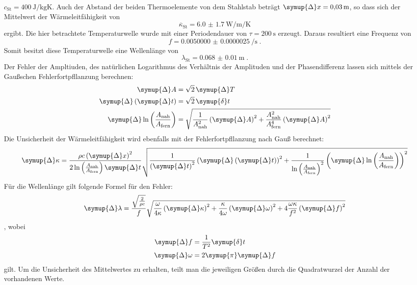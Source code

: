 $c_\text{St} = \SI{400}{\joule\per\kilogram\kelvin}$. Auch der Abstand der beiden Thermoelemente von dem Stahlstab
beträgt $\symup{\Delta} x = \SI{0.03}{\metre}$, so dass sich der Mittelwert der Wärmeleitfähigkeit von
\begin{equation}
  \overline{\kappa}_\text{St} = \SI{6.0(17)}{\watt\per\metre\per\kelvin}
\end{equation}
ergibt. Die hier betrachtete Temperaturwelle wurde mit einer Periodendauer von $\tau = \SI{200}{\second}$ erzeugt.
Daraus resultiert eine Frequenz von 
\begin{equation}
  f = \SI{0.0050000(25)}{\per\second} \; \text{.}
\end{equation}
Somit besitzt diese Temperaturwelle eine Wellenlänge von 
\begin{equation}
  \lambda_\text{St} = \SI{0.068(10)}{\metre} \; \text{.}
\end{equation}
Der Fehler der Ampltiuden, des natürlichen Logarithmus des Verhältnis der Amplituden und der Phasendifferenz 
lassen sich mittels der Gaußschen Fehlerfortpfllanzung berechnen:
\begin{align}
  \symup{\Delta} A                                                      &= \sqrt{2} \, \symup{\Delta} T \\
  \symup{\Delta} \left (\symup{\Delta} t \right )                       &= \sqrt{2} \, \symup{\delta} t \\
  \symup{\Delta} \ln \left ( \frac{A_\text{nah}}{A_\text{fern}} \right) &= 
  \sqrt{\frac{1}{A_\text{nah}^2} \left ( \symup{\Delta} A \right )^2 + 
  \frac{A_\text{nah}^2}{A_\text{fern}^4} \left ( \symup{\Delta} A \right ) ^2} 
\end{align}
Die Unsicherheit der Wärmeleitfähigkeit wird ebenfalls mit der Fehlerfortpfllanzung nach Gauß berechnet:
\begin{equation} 
  \symup{\Delta} \kappa = \frac{\rho c \left ( \symup{\Delta} x \right )^2 }
  {2\ln \left ( \frac{A_\text{nah}}{A_\text{fern}} \right ) \symup{\Delta} t} 
  \sqrt{\frac{1}{\left( \symup{\Delta} t\right)^2}
  \left ( \symup{\Delta} \left ( \symup{\Delta} t \right ) \right )^2 + \frac{1}{ \ln \left ( \frac{A_\text{nah}}{A_\text{fern}} \right )^2}
 \left (  \symup{\Delta} \ln \left ( \frac{A_\text{nah}}{A_\text{fern}} \right ) \right )^2}
\end{equation}
Für die Wellenlänge gilt folgende Formel für den Fehler: 
\begin{equation}
 \symup{\Delta} \lambda =  \frac{\sqrt{\frac{2}{\rho c}}} {f} \sqrt{ \frac{\omega}{4 \kappa} \left ( \symup{\Delta} \kappa \right )^2 +
  \frac{\kappa}{4 \omega} \left( \symup{\Delta}\omega\right)^2 +
   4 \frac{\omega\kappa}{f^2} \left(\symup{\Delta} f\right)^2   }
\end{equation}
, wobei
\begin{align}
    \symup{\Delta}f &= \frac{1}{T^2} \symup{\delta} t \\
    \symup{\Delta}\omega &= 2 \symup{\pi} \symup{\Delta} f
\end{align}
gilt. Um die Unsicherheit des Mittelwertes zu erhalten, teilt man die jeweiligen Größen durch die Quadratwurzel der Anzahl der vorhandenen Werte.